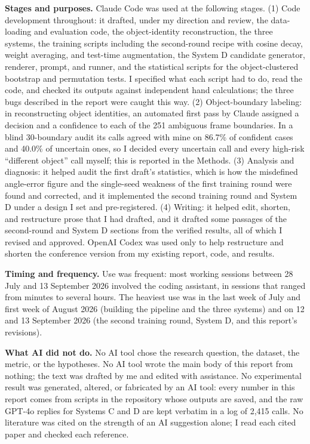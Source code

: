 \documentclass[12pt,letterpaper]{article}
\begin{document}
\textbf{Stages and purposes.} Claude Code was used at the following stages.
(1) Code development throughout: it drafted, under my direction and
review, the data-loading and evaluation code, the object-identity
reconstruction, the three systems, the training scripts including the
second-round recipe with cosine decay, weight averaging, and test-time
augmentation, the System D candidate generator, renderer, prompt, and
runner, and the statistical scripts for the object-clustered bootstrap and
permutation tests. I specified what each script had to do, read the code,
and checked its outputs against independent hand calculations; the three
bugs described in the report were caught this way. (2) Object-boundary
labeling: in reconstructing object identities, an automated first pass by
Claude assigned a decision and a confidence to each of the 251 ambiguous
frame boundaries. In a blind 30-boundary audit its calls agreed with mine
on 86.7\% of confident cases and 40.0\% of uncertain ones, so I decided
every uncertain call and every high-risk ``different object'' call
myself; this is reported in the Methods. (3) Analysis and diagnosis: it
helped audit the first draft's statistics, which is how the misdefined
angle-error figure and the single-seed weakness of the first training
round were found and corrected, and it implemented the second training
round and System D under a design I set and pre-registered. (4) Writing:
it helped edit, shorten, and restructure prose that I had drafted, and it
drafted some passages of the second-round and System D sections from the
verified results, all of which I revised and approved. OpenAI Codex was
used only to help restructure and shorten the conference version from my
existing report, code, and results.

\textbf{Timing and frequency.} Use was frequent: most working sessions
between 28 July and 13 September 2026 involved the coding assistant, in
sessions that ranged from minutes to several hours. The heaviest use was
in the last week of July and first week of August 2026 (building the
pipeline and the three systems) and on 12 and 13 September 2026 (the
second training round, System D, and this report's revisions).

\textbf{What AI did not do.} No AI tool chose the research question,
the dataset, the metric, or the hypotheses. No AI tool wrote the main
body of this report from nothing; the text was drafted by me and edited
with assistance. No experimental result was generated, altered, or
fabricated by an AI tool: every number in this report comes from scripts
in the repository whose outputs are saved, and the raw GPT-4o replies for
Systems C and D are kept verbatim in a log of 2,415 calls. No literature
was cited on the strength of an AI suggestion alone; I read each cited
paper and checked each reference.
\end{document}

